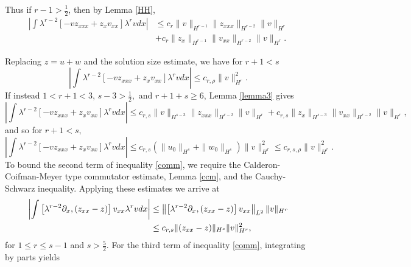 \documentclass[reqno]{amsart}
\theoremstyle{plain}
\numberwithin{equation}{section}
\begin{document}
\noindent Thus if $r - 1 > \frac12$, then by Lemma \ref{HH},
    \begin{align*}
        \left|\int \lambda^{r-2}\left[-vz_{xxx} + z_xv_{xx}\right]\lambda^{r}vdx\right|
        &\leq c_{r}\|v\|_{H^{r-1}}\|z_{xxx}\|_{H^{r-2}}\|v\|_{H^r} 
            \\&+ c_{r}\|z_x\|_{H^{r-1}}\|v_{xx}\|_{H^{r-2}}\|v\|_{H^r}.
    \end{align*}

Replacing $z = u + w$ and the solution size estimate, we have for $r+1 < s$
    \[\left|\int \lambda^{r-2}\left[-vz_{xxx} + z_xv_{xx}\right]\lambda^{r}vdx\right|   
        \leq   c_{r,\rho}\|v\|_{H^r}^2.\]
If instead $1 < r + 1 < 3$, $s - 3 > \frac12,$ and $r + 1 + s \geq 6$, Lemma \ref{lemma3} gives
\begin{equation*}
        \left|\int \lambda^{r-2}\left[-vz_{xxx} + z_xv_{xx}\right]\lambda^{r}vdx\right|
        \leq c_{r,s}\|v\|_{H^{s-3}}\|z_{xxx}\|_{H^{r-2}}\|v\|_{H^r} 
                + c_{r,s}\|z_x\|_{H^{s-3}}\|v_{xx}\|_{H^{r-2}}\|v\|_{H^r},
\end{equation*}
and so for $r + 1 < s,$
\begin{equation}\label{term1pt1est}
    \left|\int \lambda^{r-2}\left[-vz_{xxx} + z_xv_{xx}\right]\lambda^{r}vdx\right| 
        \leq c_{r,s}(\|u_{0}\|_{H^{s}} + \|w_0\|_{H^s})\|v\|^2_{H^r} \leq c_{r,s,\rho}\|v\|^2_{H^r}.
\end{equation}
To bound the second term of inequality \eqref{comm}, we require the  Calderon-Coifman-Meyer type commutator estimate, Lemma \ref{ccm}, and the Cauchy-Schwarz inequality.
 Applying these estimates we arrive at
\begin{align} \notag
    \left| \int \left[\lambda^{r-2} \partial_x, (z_{xx}-z)\right]v_{xx}\lambda^{r}vdx \right| 
        &\leq \left\|\left[\lambda^{r-2} \partial_x, (z_{xx}-z)\right] v_{xx} \right\|_{L^2} \|v\|_{H^r} 
        \\ &
            \leq c_{r,s}\|(z_{xx}-z)\|_{H^s}\|v\|^2_{H^r}\label{term1pt2est}
,
\end{align}
for $1 \leq r \leq s-1$ and $s > \frac52$.
For the third term of inequality \eqref{comm}, integrating by parts yields
\end{document}
